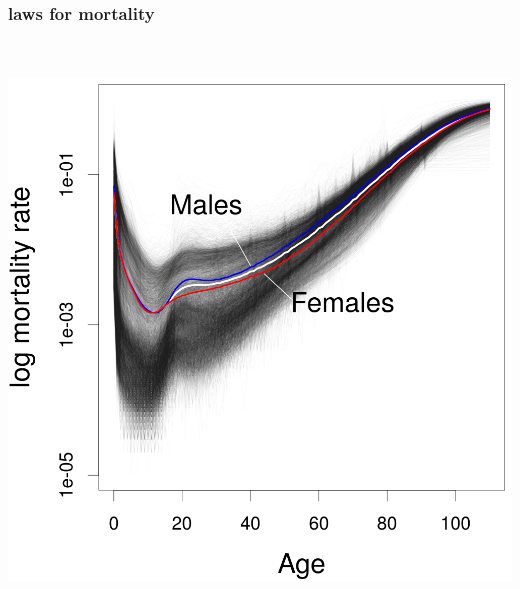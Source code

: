 \documentclass[20pt]{beamer}
\begin{document}
\begin{frame}
\frametitle{laws for mortality}
\vspace{-1em}
\begin{center}
\includegraphics[height=6in]{Figures/Mortality3.png}
\end{center}
\end{frame}
\end{document}
